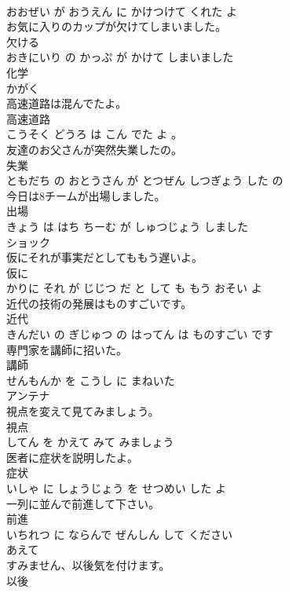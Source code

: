 \documentclass[8pt]{extreport}
\begin{document}
\begin{CJK}{UTF8}{min}
\\	おおぜい が おうえん に かけつけて くれた よ			
\\	お気に入りのカップが欠けてしまいました。	
\\	欠ける 
\\	おきにいり の かっぷ が かけて しまいました			
\\	化学	
\\	かがく			
\\	高速道路は混んでたよ。	
\\	高速道路 
\\	こうそく どうろ は こん でた よ 。			
\\	友達のお父さんが突然失業したの。	
\\	失業 
\\	ともだち の おとうさん が とつぜん しつぎょう した の			
\\	今日は8チームが出場しました。	
\\	出場 
\\	きょう は はち ちーむ が しゅつじょう しました			
\\	ショック	
\\	仮にそれが事実だとしてももう遅いよ。	
\\	仮に 
\\	かりに それ が じじつ だ と して も もう おそい よ			
\\	近代の技術の発展はものすごいです。	
\\	近代 
\\	きんだい の ぎじゅつ の はってん は ものすごい です			
\\	専門家を講師に招いた。	
\\	講師 
\\	せんもんか を こうし に まねいた			
\\	アンテナ	
\\	視点を変えて見てみましょう。	
\\	視点 
\\	してん を かえて みて みましょう			
\\	医者に症状を説明したよ。	
\\	症状 
\\	いしゃ に しょうじょう を せつめい した よ			
\\	一列に並んで前進して下さい。	
\\	前進 
\\	いちれつ に ならんで ぜんしん して ください			
\\	あえて	
\\	すみません、以後気を付けます。	
\\	以後 

\end{CJK}
\end{document}
